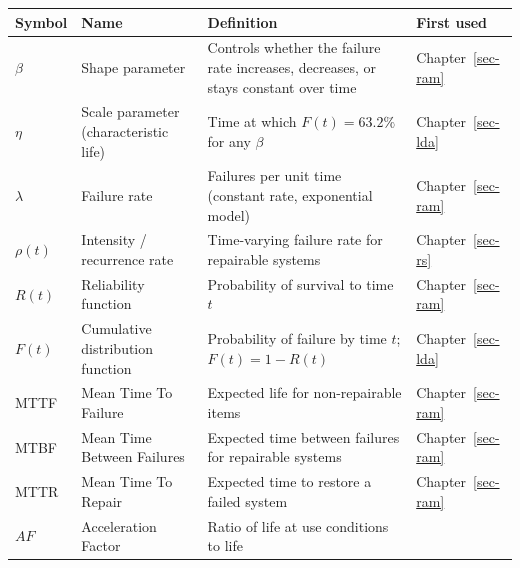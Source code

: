 \documentclass[
  letterpaper,
  DIV=11,
  numbers=noendperiod]{scrreprt}
\newcounter{none} %
\begin{document}
{\def\LTcaptype{none} %
\begin{longtable}[]{@{}
  >{\centering\arraybackslash}p{}
  >{\raggedright\arraybackslash}p{}
  >{\raggedright\arraybackslash}p{}
  >{\centering\arraybackslash}p{}@{}}
\toprule\noalign{}
\begin{minipage}[b]{\linewidth}\centering
Symbol
\end{minipage} & \begin{minipage}[b]{\linewidth}\raggedright
Name
\end{minipage} & \begin{minipage}[b]{\linewidth}\raggedright
Definition
\end{minipage} & \begin{minipage}[b]{\linewidth}\centering
First used
\end{minipage} \\
\midrule\noalign{}
\endhead
\bottomrule\noalign{}
\endlastfoot
\(\beta\) & Shape parameter & Controls whether the failure rate
increases, decreases, or stays constant over time &
Chapter~\ref{sec-ram} \\
\(\eta\) & Scale parameter (characteristic life) & Time at which
\(F(t) = 63.2\%\) for any \(\beta\) & Chapter~\ref{sec-lda} \\
\(\lambda\) & Failure rate & Failures per unit time (constant rate,
exponential model) & Chapter~\ref{sec-ram} \\
\(\rho(t)\) & Intensity / recurrence rate & Time-varying failure rate
for repairable systems & Chapter~\ref{sec-rs} \\
\(R(t)\) & Reliability function & Probability of survival to time \(t\)
& Chapter~\ref{sec-ram} \\
\(F(t)\) & Cumulative distribution function & Probability of failure by
time \(t\); \(F(t) = 1 - R(t)\) & Chapter~\ref{sec-lda} \\
MTTF & Mean Time To Failure & Expected life for non-repairable items &
Chapter~\ref{sec-ram} \\
MTBF & Mean Time Between Failures & Expected time between failures for
repairable systems & Chapter~\ref{sec-ram} \\
MTTR & Mean Time To Repair & Expected time to restore a failed system &
Chapter~\ref{sec-ram} \\
\(AF\) & Acceleration Factor & Ratio of life at use conditions to life

\end{longtable}}
\end{document}
